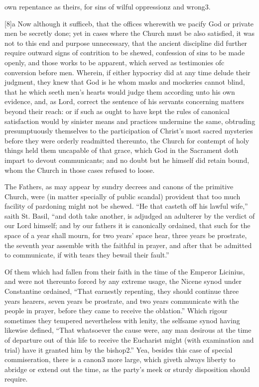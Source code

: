 own repentance as theirs, for sins of wilful oppressionz and wrong3.


[8]a Now although it sufficeb, that the offices wherewith we pacify God or private men be secretly done; yet in cases where the Church must be also satisfied, it was not to this end and purpose unnecessary, that the ancient discipline did further require outward signs of contrition to be shewed, confession of sins to be made openly, and those works to be apparent, which served as testimonies ofc conversion before men. Wherein, if either hypocrisy did at any time delude their judgment, they knew that God is he whom masks and mockeries cannot blind, that he which seeth men’s hearts would judge them according unto his own evidence, and, as Lord, correct the sentence of his servants concerning matters beyond their reach: or if such as ought to have kept the rules of canonical satisfaction would by sinister means and practices undermine the same, obtruding presumptuously themselves to the participation of Christ’s most sacred mysteries before they were orderly readmitted thereunto, the Church for contempt of holy things held them uncapable of that grace, which God in the Sacrament doth impart to devout communicants; and no doubt but he himself did retain bound, whom the Church in those cases refused to loose.

The Fathers, as may appear by sundry decrees and canons of the primitive Church, were (in matter specially of public scandal) provident that too much facility of pardoning might not be shewed. “He that casteth off his lawful wife,” saith St. Basil, “and doth take another, is adjudged an adulterer by the verdict of our Lord himself; and by our fathers it is canonically ordained, that such for the space of a year shall mourn, for two years’ space hear, three years be prostrate,  the seventh year assemble with the faithful in prayer, and after that be admitted to communicate, if with tears they bewail their fault.”

Of them which had fallen from their faith in the time of the Emperor Licinius, and were not thereunto forced by any extreme usage, the Nicene synod under Constantine ordained, “That earnestly repenting, they should continue three years hearers, seven years be prostrate, and two years communicate with the people in prayer, before they came to receive the oblation.” Which rigour sometimes they tempered nevertheless with lenity, the selfsame synod having likewise defined, “That whatsoever the cause were, any man desirous at the time of departure out of this life to receive the Eucharist might (with examination and trial) have it granted him by the bishop2.” Yea, besides this case of special commiseration, there is a canon3 more large, which giveth always liberty to abridge or extend out the time, as the party’s meek or sturdy disposition should require.

